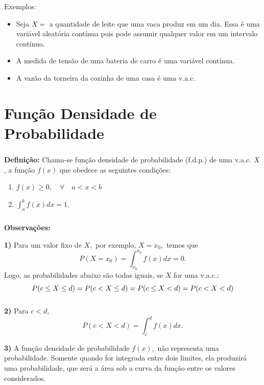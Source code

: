 \documentclass[14pt,aspectratio=1610]{beamer}
\begin{document}
\begin{frame}{}
\frametitle{}
\begin{block}{Exemplos:}
\begin{itemize}
\item \justifying Seja $X=$ a quantidade de leite que uma vaca produz em um dia. Essa é uma variável aleatória contínua pois pode assumir qualquer valor em um intervalo contínuo. \pause
\item \justifying A medida de tensão de uma bateria de carro é uma variável contínua.\pause
\item \justifying A vazão da torneira da cozinha de uma casa é uma v.a.c.
\end{itemize}
\end{block}
\end{frame}

\section{Função Densidade de Probabilidade}
\begin{frame}{}
\frametitle{}
\begin{block}{}
\textbf{Definição:} Chama-se função densidade de probabilidade (f.d.p.) de uma v.a.c. $X$, a função $f(x)$ que obedece as seguintes condições:

\begin{enumerate}
\item $f(x)\geq 0,\quad \forall \quad a<x<b$
\item $\displaystyle \int_{a}^{b}f(x)dx=1$.
\end{enumerate}
\end{block}
\end{frame}

\begin{frame}{}
\frametitle{}
\begin{block}{}
\justifying
\textbf{Observações:}

\textbf{1)} Para um valor fixo de $X,$ por exemplo, $X=x_{0},$ temos que $$\displaystyle P(X=x_{0})=\int_{x_{0}}^{x_{0}}f(x)dx=0.$$ Logo, as probabilidades abaixo são todas iguais, se $X$ for uma v.a.c.: 
$${\small P(c\leq X\leq d)=P(c< X\leq d)=P(c\leq X< d)=P(c< X< d)}$$
\end{block}
\end{frame}

\begin{frame}{}
\frametitle{}
\begin{block}{}
\justifying
\textbf{2)} Para $c<d,$ $$\displaystyle P(c<X<d)=\int_{c}^{d}f(x)dx.$$\pause

\textbf{3)} A função densidade de probabilidade $f(x),$ não representa uma pro\-ba\-bi\-li\-da\-de. Somente quando for integrada entre dois limites, ela produzirá uma pro\-ba\-bi\-li\-da\-de, que será a área sob a curva da função entre os valores considerados.
\end{block}
\end{frame}
\end{document}
